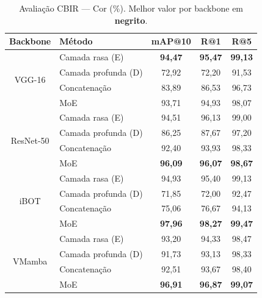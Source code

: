 \documentclass[conference]{IEEEtran}
\begin{document}
\begin{table}[htbp]
\caption{Avaliação CBIR --- Cor (\%). Melhor valor por backbone em
         \textbf{negrito}.}
\begin{center}
\begin{tabular}{c|l|c|c|c}
\hline
\textbf{Backbone} & \textbf{Método} & \textbf{mAP@10}
                  & \textbf{R@1} & \textbf{R@5} \\
\hline
\multirow{4}{*}{VGG-16}
  & Camada rasa (E)          & \textbf{94,47} & \textbf{95,47} & \textbf{99,13} \\
  & Camada profunda (D)      & 72,92 & 72,20 & 91,53 \\
  & Concatenação             & 83,89 & 86,53 & 96,73 \\
  & MoE                      & 93,71 & 94,93 & 98,07 \\
\hline
\multirow{4}{*}{ResNet-50}
  & Camada rasa (E)          & 94,51 & 96,13 & 99,00 \\
  & Camada profunda (D)      & 86,25 & 87,67 & 97,20 \\
  & Concatenação             & 92,40 & 93,93 & 98,33 \\
  & MoE                      & \textbf{96,09} & \textbf{96,07} & \textbf{98,67} \\
\hline
\multirow{4}{*}{iBOT}
  & Camada rasa (E)          & 94,93 & 95,40 & 99,13 \\
  & Camada profunda (D)      & 71,85 & 72,00 & 92,47 \\
  & Concatenação             & 75,06 & 76,67 & 94,13 \\
  & MoE                      & \textbf{97,96} & \textbf{98,27} & \textbf{99,47} \\
\hline
\multirow{4}{*}{VMamba}
  & Camada rasa (E)          & 93,20 & 94,33 & 98,47 \\
  & Camada profunda (D)      & 91,73 & 93,13 & 98,33 \\
  & Concatenação             & 92,51 & 93,67 & 98,40 \\
  & MoE                      & \textbf{96,91} & \textbf{96,87} & \textbf{99,07} \\
\hline
\end{tabular}
\label{tab_cbir_color}
\end{center}
\end{table}
\end{document}
